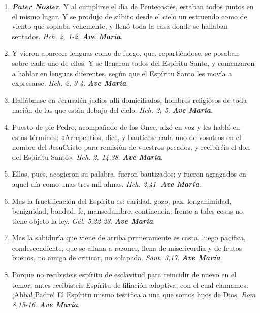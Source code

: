 \documentclass[../../devocionario.tex]{subfiles}
\begin{document}
    \begin{enumerate}
    
        \item \textbf{\emph{Pater Noster}}. Y al cumplirse el día de Pentecostés, estaban todos juntos en el mismo lugar. 
            Y se produjo de súbito desde el cielo un estruendo como de viento que soplaba vehemente, 
            y llenó toda la casa donde se hallaban sentados. \emph{Hch. 2, 1-2}. \textbf{\emph{Ave María}}.

        \item Y vieron aparecer lenguas como de fuego, que, repartiéndose, se posaban sobre cada uno de ellos. 
            Y se llenaron todos del Espíritu Santo, y comenzaron a hablar en lenguas diferentes, 
            según que el Espíritu Santo les movía a expresarse. \emph{Hch. 2, 3-4}. \textbf{\emph{Ave María}}.

        \item Hallábanse en Jerusalén judíos allí domiciliados, hombres religiosos de toda nación de las que están debajo del cielo. \emph{Hch. 2, 5}. \textbf{\emph{Ave María}}.

        \item Puesto de pie Pedro, acompañado de los Once, alzó en voz y les habló en estos términos: 
            «Arrepentíos, dice, y bautícese cada uno de vosotros en el nombre del JesuCristo para remisión de vuestros pecados, 
            y recibiréis el don del Espíritu Santo». \emph{Hch. 2, 14.38}. \textbf{\emph{Ave María}}.

        \item Ellos, pues, acogieron su palabra, fueron bautizados; y fueron agragados en aquel día como unas tres mil almas. \emph{Hch. 2,41}. \textbf{\emph{Ave María}}.

        \item Mas la fructificación del Espíritu es: caridad, gozo, paz, longanimidad, benignidad, 
            bondad, fe, mansedumbre, continencia; frente a tales cosas no tiene objeto la ley. \emph{Gál. 5,22-23}. \textbf{\emph{Ave María}}.

        \item Mas la sabiduría que viene de arriba primeramente es casta, luego pacífica, condescendiente, 
            que se allana a razones, llena de misericordia y de frutos buenos, 
            no amiga de criticar, no solapada. \emph{Sant. 3,17}. \textbf{\emph{Ave María}}.

        \item Porque no recibisteis espíritu de esclavitud para reincidir de nuevo en el temor; antes recibisteis Espíritu de filiación adoptiva, con el cual clamamos: ¡Abba!¡Padre! 
            El Espíritu mismo testifica a una que somos hijos de Dios. \emph{Rom 8,15-16}. \textbf{\emph{Ave María}}.


\end{enumerate}
\end{document}
